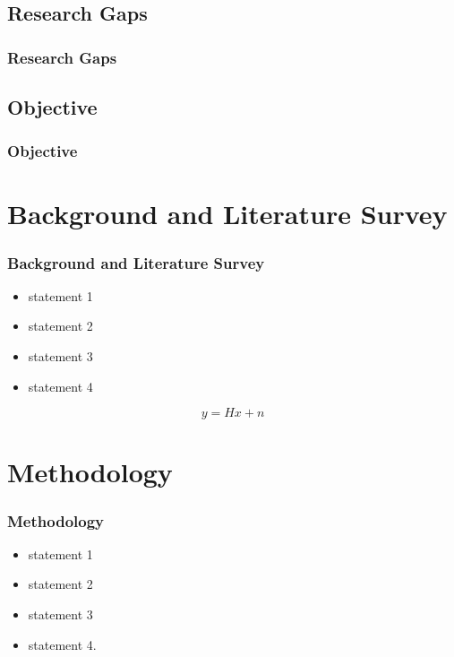 \documentclass{beamer}
\begin{document}
\subsection{Research Gaps}
\begin{frame}[allowframebreaks]
\frametitle{Research Gaps}
\end{frame}


\subsection{Objective}
\begin{frame}[allowframebreaks]
\frametitle{Objective}
\end{frame}




\section{Background and Literature Survey}
\begin{frame}[allowframebreaks]
\frametitle{Background and Literature Survey}
\begin{itemize}
\item statement 1
\item statement 2
\item statement 3
\item statement 4
\end{itemize}


\begin{equation}
     y = Hx + n 
\end{equation}

\end{frame}






\section{Methodology}
\begin{frame}[allowframebreaks]
\frametitle{Methodology}
\begin{itemize}
\item statement 1
\item statement 2
\item statement 3
\item statement 4\footnotemark. 
\end{itemize}
\end{frame}
\end{document}
